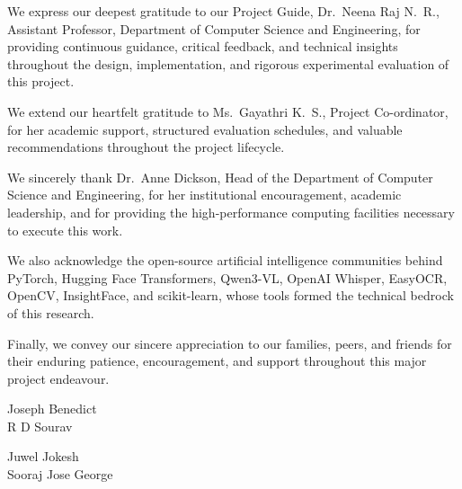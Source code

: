 \documentclass[12pt,a4paper]{report}
\begin{document}
\noindent
We express our deepest gratitude to our Project Guide, Dr.~Neena Raj N.~R., Assistant Professor, Department of Computer Science and Engineering, for providing continuous guidance, critical feedback, and technical insights throughout the design, implementation, and rigorous experimental evaluation of this project.

\par
\vspace{0.3cm}

\noindent
We extend our heartfelt gratitude to Ms.~Gayathri K.~S., Project Co-ordinator, for her academic support, structured evaluation schedules, and valuable recommendations throughout the project lifecycle.

\par
\vspace{0.3cm}

\noindent
We sincerely thank Dr.~Anne Dickson, Head of the Department of Computer Science and Engineering, for her institutional encouragement, academic leadership, and for providing the high-performance computing facilities necessary to execute this work.

\par
\vspace{0.3cm}

\noindent
We also acknowledge the open-source artificial intelligence communities behind PyTorch, Hugging Face Transformers, Qwen3-VL, OpenAI Whisper, EasyOCR, OpenCV, InsightFace, and scikit-learn, whose tools formed the technical bedrock of this research.

\par
\vspace{0.3cm}

\noindent
Finally, we convey our sincere appreciation to our families, peers, and friends for their enduring patience, encouragement, and support throughout this major project endeavour.

\vspace{1cm}

\noindent
\begin{minipage}[t]{0.45\linewidth}
    \raggedright
    Joseph Benedict\\[0.3cm]
    R D Sourav
\end{minipage}
\hfill
\begin{minipage}[t]{0.45\linewidth}
    \raggedleft
    Juwel Jokesh\\[0.3cm]
    Sooraj Jose George
\end{minipage}
\end{document}
